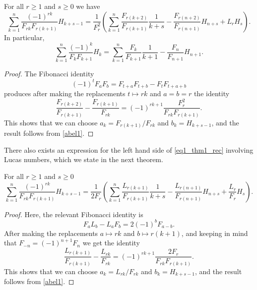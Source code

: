 \documentclass[12pt,reqno]{article}
\begin{document}
	\begin{theorem}\label{thm1_rec}
		For all $r\geq 1$ and $s\geq 0$ we have
		\begin{equation}\label{eq1_thm1_rec}
			\sum_{k=1}^n \frac{(-1)^{rk}}{F_{rk} F_{r(k+1)}} H_{k+s-1} = \frac{1}{F_r^2} \left ( \sum_{k=1}^n \frac{F_{r(k+2)}}{F_{r(k+1)}}\frac{1}{k+s}
			- \frac{F_{r(n+2)}}{F_{r(n+1)}} H_{n+s} + L_r H_s \right ).
		\end{equation}
		In particular,
		\begin{equation}
			\sum_{k=1}^n \frac{(-1)^{k}}{F_{k} F_{k+1}} H_{k} = \sum_{k=1}^n \frac{F_{k}}{F_{k+1}}\frac{1}{k+1} - \frac{F_{n}}{F_{n+1}} H_{n+1}.
		\end{equation}
	\end{theorem}
	\begin{proof}
		The Fibonacci identity
		\begin{equation*}
			(-1)^t F_a F_b = F_{t+a}F_{t+b} - F_t F_{t+a+b}
		\end{equation*}
		produces after making the replacements $t\mapsto rk$ and $a=b=r$ the identity
		\begin{equation*}
			\frac{F_{r(k+2)}}{F_{r(k+1)}} - \frac{F_{r(k+1)}}{F_{rk}} = (-1)^{rk+1} \frac{F_r^2}{F_{rk} F_{r(k+1)}}.
		\end{equation*}
		This shows that we can choose $a_k=F_{r(k+1)}/F_{rk}$ and $b_k=H_{k+s-1}$, and the result follows from \eqref{abel1}.
	\end{proof}
	
	There also exists an expression for the left hand side of \eqref{eq1_thm1_rec} involving Lucas numbers, which we state in the next theorem.
	
	\begin{theorem}\label{thm2_rec}
		For all $r\geq 1$ and $s\geq 0$
		\begin{equation}\label{eq2_thm1_rec}
			\sum_{k=1}^n \frac{(-1)^{rk}}{F_{rk} F_{r(k+1)}} H_{k+s-1} = \frac{1}{2 F_r} \left ( \sum_{k=1}^n \frac{L_{r(k+1)}}{F_{r(k+1)}}\frac{1}{k+s}
			- \frac{L_{r(n+1)}}{F_{r(n+1)}} H_{n+s} + \frac{L_r}{F_r} H_s \right ).
		\end{equation}
	\end{theorem}
	\begin{proof}
		Here, the relevant Fibonacci identity is
		\begin{equation*}
			F_a L_b - L_{a} F_{b} = 2 (-1)^b F_{a-b}.
		\end{equation*}
		After making the replacements $a\mapsto rk$ and $b\mapsto r(k+1)$, and keeping in mind that $F_{-n}=(-1)^{n+1}F_n$ we get the identity
		\begin{equation*}
			\frac{L_{r(k+1)}}{F_{r(k+1)}} - \frac{L_{rk}}{F_{rk}} = (-1)^{rk+1} \frac{2 F_r}{F_{rk} F_{r(k+1)}}.
		\end{equation*}
		This shows that we can choose $a_k=L_{rk}/F_{rk}$ and $b_k=H_{k+s-1}$, and the result follows from \eqref{abel1}.
	\end{proof}
	
\end{document}
